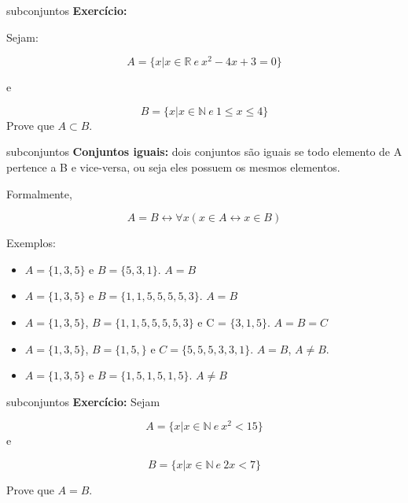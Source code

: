 \documentclass[aspectratio=169]{beamer}
\begin{document}
\begin{frame}{subconjuntos}
    \textbf{Exercício:}
    \vspace{4mm}
    
    Sejam: 
    
    \[A = \{x | x \in \mathbb{R} ~ e ~ x^2 - 4x + 3 = 0\}\]

e

    \[B = \{x | x \in \mathbb{N} ~ e ~ 1 \leq x \leq 4\}\]
    \vspace{4mm}
Prove que $A \subset B.$

\end{frame}

\begin{frame}{subconjuntos}
   \textbf{ Conjuntos iguais:} dois conjuntos são iguais se todo elemento de A pertence a B e vice-versa, ou seja eles possuem os mesmos elementos.

   \vspace{4mm}

   Formalmente,

   \[ A = B \leftrightarrow \forall x (x \in A \leftrightarrow x \in B) \]

   Exemplos:


    \begin{itemize}
        \item $ A = \{1,3,5\}$ e $ B = \{5,3,1\}$. $A = B$
        \item $ A = \{1,3,5\}$ e $ B = \{1,1,5,5,5,5,3\}$. $A = B$
        \item $ A = \{1,3,5\}$, $ B = \{1,1,5,5,5,5,3\}$ e C = $\{3,1,5\}$. $A = B = C$
        \item $ A = \{1,3,5\}$, $ B = \{1,5,\}$ e $C = \{5,5,5,3,3,1\}$. $A = B$, $A \neq B$.
        \item $ A = \{1,3,5\}$ e $ B = \{1,5,1,5,1,5\}$. $A \neq B$
    \end{itemize}
\end{frame}


\begin{frame}{subconjuntos}
    \textbf{ Exercício:} Sejam

    \[ A = \{x|x \in \mathbb{N} ~ e ~ x^2 < 15\} \]
    e
    
    \[ B = \{x|x \in \mathbb{N} ~ e ~ 2x < 7 \} \]

    Prove que $A = B.$
 
 \end{frame}
\end{document}

